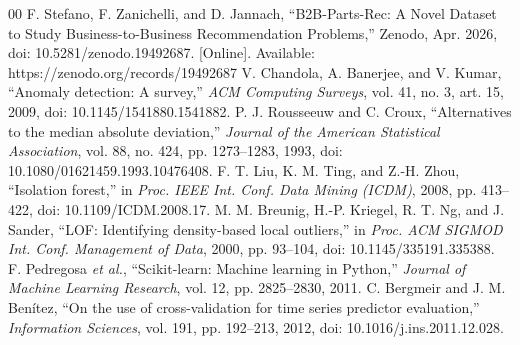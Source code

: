 \documentclass[conference]{IEEEtran}
\begin{document}
\begin{thebibliography}{00}
 F. Stefano, F. Zanichelli, and D. Jannach, ``B2B-Parts-Rec: A Novel Dataset to Study Business-to-Business Recommendation Problems,'' Zenodo, Apr. 2026, doi: 10.5281/zenodo.19492687. [Online]. Available: https://zenodo.org/records/19492687
 V. Chandola, A. Banerjee, and V. Kumar, ``Anomaly detection: A survey,'' \textit{ACM Computing Surveys}, vol. 41, no. 3, art. 15, 2009, doi: 10.1145/1541880.1541882.
 P. J. Rousseeuw and C. Croux, ``Alternatives to the median absolute deviation,'' \textit{Journal of the American Statistical Association}, vol. 88, no. 424, pp. 1273--1283, 1993, doi: 10.1080/01621459.1993.10476408.
 F. T. Liu, K. M. Ting, and Z.-H. Zhou, ``Isolation forest,'' in \textit{Proc. IEEE Int. Conf. Data Mining (ICDM)}, 2008, pp. 413--422, doi: 10.1109/ICDM.2008.17.
 M. M. Breunig, H.-P. Kriegel, R. T. Ng, and J. Sander, ``LOF: Identifying density-based local outliers,'' in \textit{Proc. ACM SIGMOD Int. Conf. Management of Data}, 2000, pp. 93--104, doi: 10.1145/335191.335388.
 F. Pedregosa \textit{et al.}, ``Scikit-learn: Machine learning in Python,'' \textit{Journal of Machine Learning Research}, vol. 12, pp. 2825--2830, 2011.
 C. Bergmeir and J. M. Ben\'itez, ``On the use of cross-validation for time series predictor evaluation,'' \textit{Information Sciences}, vol. 191, pp. 192--213, 2012, doi: 10.1016/j.ins.2011.12.028.
\end{thebibliography}
\end{document}
